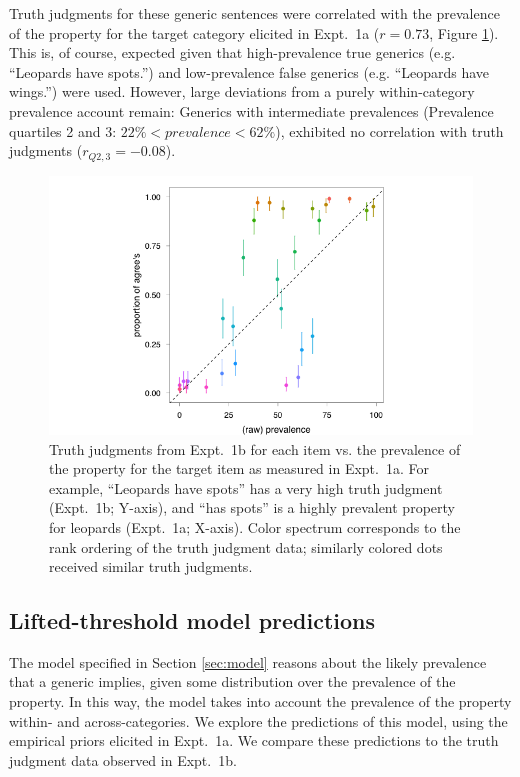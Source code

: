 \documentclass[10pt,letterpaper]{article}
\begin{document}
Truth judgments for these generic sentences were correlated with the prevalence of the property for the target category elicited in Expt.~1a ($r = 0.73$, Figure \ref{fig:scatterprev}). This is, of course, expected given that high-prevalence true generics (e.g. ``Leopards have spots.'') and low-prevalence false generics (e.g. ``Leopards have wings.'') were used. 
However, large deviations from a purely within-category prevalence account remain: Generics with intermediate prevalences (Prevalence quartiles 2 and 3: $ 22\% < prevalence < 62\%$), exhibited no correlation with truth judgments ($r_{Q2,3} = -0.08$).


\begin{figure}
\centering
    \includegraphics[width=0.8\columnwidth]{tj_n50_tjVsPrevalence}
    \caption{Truth judgments from Expt.~1b for each item vs. the prevalence of the property for the target item as measured in Expt.~1a. For example, ``Leopards have spots'' has a very high truth judgment (Expt.~1b; Y-axis), and ``has spots'' is a highly prevalent property for leopards (Expt.~1a; X-axis). Color spectrum corresponds to the rank ordering of the truth judgment data; similarly colored dots received similar truth judgments.}
  \label{fig:scatterprev}
\end{figure}




\subsection{Lifted-threshold model predictions}

The model specified in Section \ref{sec:model} reasons about the likely prevalence that a generic implies, given some distribution over the prevalence of the property. In this way, the model takes into account the prevalence of the property within- and across-categories.
We explore the predictions of this model, using the empirical priors elicited in Expt.~1a. 
We compare these predictions to the truth judgment data observed in Expt.~1b.
\end{document}
